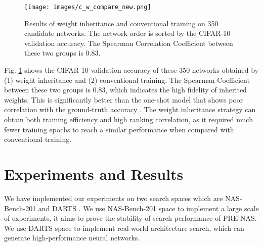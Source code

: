 \documentclass[sigconf]{acmart}
\begin{document}
 \begin{figure}[t!]
    \begin{center}
  	\texttt{[image: images/c\_w\_compare\_new.png]}
  	\caption{Results of weight inheritance and conventional training on 350 candidate networks.  The network order is sorted by the CIFAR-10 validation accuracy.  The Spearman Correlation Coefficient between these two groups is 0.83.}
  	\label{c_w_compare}
  	\end{center}
\end{figure} 

Fig. \ref{c_w_compare} shows the CIFAR-10 validation accuracy of these 350 networks obtained by (1) weight inheritance and (2) conventional training.  The Spearman Coefficient between these two groups is 0.83, which indicates the high fidelity of inherited weights. This is significantly better than the one-shot model that shows poor correlation with the ground-truth accuracy \cite{Ref:50}.  The weight inheritance strategy can obtain both training efficiency and high ranking correlation, as it required much fewer training epochs to reach a similar performance when compared with conventional training.


\section{Experiments and Results}
\label{section4}
We have implemented our experiments on two search spaces which are NAS-Bench-201 \cite{Ref:45} and DARTS \cite{Ref:10}. We use NAS-Bench-201 space to implement a large scale of experiments, it aims to prove the stability of search performance of PRE-NAS. We use DARTS space to implement real-world architecture search, which can generate high-performance neural networks.
\end{document}
